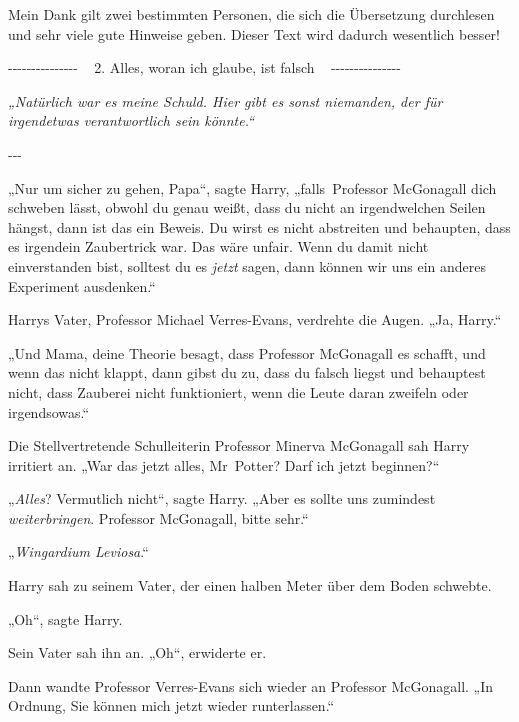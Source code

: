 

\hypertarget{alles-woran-ich-glaube-ist-falsch}{%

Mein Dank gilt zwei bestimmten Personen, die sich die Übersetzung durchlesen und sehr viele gute Hinweise geben. Dieser Text wird dadurch wesentlich besser!

-\/-\/-\/-\/-\/-\/-\/-\/-\/-\/-\/-\/-\/-\/- ~ 2. Alles, woran ich glaube, ist falsch ~ -\/-\/-\/-\/-\/-\/-\/-\/-\/-\/-\/-\/-\/-\/-

\emph{„Natürlich war es meine Schuld. Hier gibt es sonst niemanden, der für irgendetwas verantwortlich sein könnte.“}

-\/-\/-

„Nur um sicher zu gehen, Papa“, sagte Harry, „falls~Professor McGonagall dich schweben lässt, obwohl du genau weißt, dass du nicht an irgendwelchen Seilen hängst, dann ist das ein Beweis. Du wirst es nicht abstreiten und behaupten, dass es irgendein Zaubertrick war. Das wäre unfair. Wenn du damit nicht einverstanden bist, solltest du es \emph{jetzt} sagen, dann können wir uns ein anderes Experiment ausdenken.“

Harrys Vater, Professor Michael Verres-Evans, verdrehte die Augen. „Ja, Harry.“

„Und Mama, deine Theorie besagt, dass Professor McGonagall es schafft, und wenn das nicht klappt, dann gibst du zu, dass du falsch liegst und behauptest nicht, dass Zauberei nicht funktioniert, wenn die Leute daran zweifeln oder irgendsowas.“

Die Stellvertretende Schulleiterin Professor Minerva McGonagall sah Harry irritiert an. „War das jetzt alles, Mr~Potter? Darf ich jetzt beginnen?“

„\emph{Alles}? Vermutlich nicht“, sagte Harry. „Aber es sollte uns zumindest \emph{weiterbringen}. Professor McGonagall, bitte sehr.“

„\emph{Wingardium Leviosa}.“

Harry sah zu seinem Vater, der einen halben Meter über dem Boden schwebte.

„Oh“, sagte Harry.

Sein Vater sah ihn an. „Oh“, erwiderte er.

Dann wandte Professor Verres-Evans sich wieder an Professor McGonagall. „In Ordnung, Sie können mich jetzt wieder runterlassen.“

}

